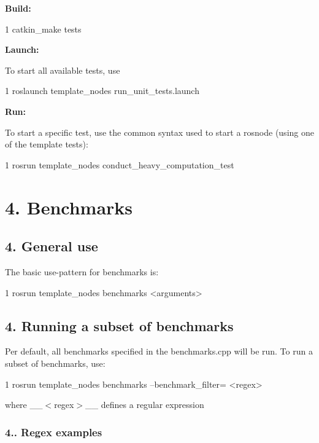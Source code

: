 {\bfseries Build\+:}


\begin{DoxyCode}
1 catkin\_make tests
\end{DoxyCode}


{\bfseries Launch\+:}

To start all available tests, use


\begin{DoxyCode}
1 roslaunch template\_nodes run\_unit\_tests.launch
\end{DoxyCode}


{\bfseries Run\+:}

To start a specific test, use the common syntax used to start a rosnode (using one of the template tests)\+:


\begin{DoxyCode}
1 rosrun template\_nodes conduct\_heavy\_computation\_test
\end{DoxyCode}
 



\section*{4. Benchmarks}

\subsection*{4. General use}

The basic use-\/pattern for benchmarks is\+:


\begin{DoxyCode}
1 rosrun template\_nodes benchmarks <arguments>
\end{DoxyCode}
 



\subsection*{4. Running a subset of benchmarks}

Per default, all benchmarks specified in the benchmarks.\+cpp will be run. To run a subset of benchmarks, use\+:


\begin{DoxyCode}
1 rosrun template\_nodes benchmarks --benchmark\_filter= <regex>
\end{DoxyCode}


where \+\_\+\+\_\+$<$regex$>$\+\_\+\+\_\+ defines a regular expression

\subsubsection*{4.. Regex examples}

